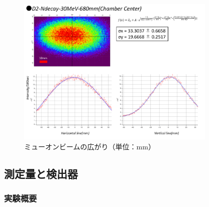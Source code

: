 \begin{figure}[H]
\centering
\includegraphics[width=0.85\textwidth]{figure/hayakawa/profile.pdf}
\caption{ミューオンビームの広がり（単位：$\mathrm{mm}$）}
\label{muon2}
\end{figure}

\subsection{測定量と検出器}

\subsubsection{実験概要}

